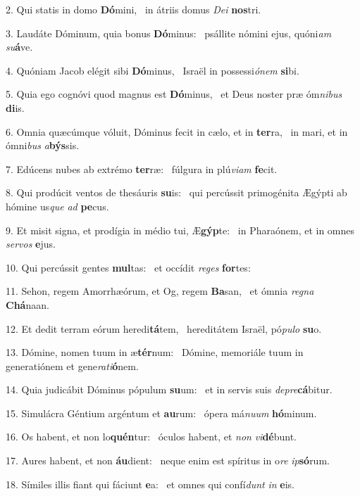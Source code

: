 2. Qui statis in domo \textbf{Dó}mini, \ast\  in átriis domus \textit{De}\textit{i} \textbf{nos}tri.\

3. Laudáte Dóminum, quia bonus \textbf{Dó}minus: \ast\  psállite nómini ejus, quóni\textit{am} \textit{su}\textbf{á}ve.\

4. Quóniam Jacob elégit sibi \textbf{Dó}minus, \ast\  Israël in possessi\textit{ó}\textit{nem} \textbf{si}bi.\

5. Quia ego cognóvi quod magnus est \textbf{Dó}minus, \ast\  et Deus noster præ óm\textit{ni}\textit{bus} \textbf{di}is.\

6. Omnia quæcúmque vóluit, Dóminus fecit in cælo, et in \textbf{ter}ra, \ast\  in mari, et in ómni\textit{bus} \textit{a}\textbf{býs}sis.\

7. Edúcens nubes ab extrémo \textbf{ter}ræ: \ast\  fúlgura in plú\textit{vi}\textit{am} \textbf{fe}cit.\

8. Qui prodúcit ventos de thesáuris \textbf{su}is: \ast\  qui percússit primogénita Ægýpti ab hómine us\textit{que} \textit{ad} \textbf{pe}cus.\

9. Et misit signa, et prodígia in médio tui, Æ\textbf{gýp}te: \ast\  in Pharaónem, et in omnes \textit{ser}\textit{vos} \textbf{e}jus.\

10. Qui percússit gentes \textbf{mul}tas: \ast\  et occídit \textit{re}\textit{ges} \textbf{for}tes:\

11. Sehon, regem Amorrhæórum, et Og, regem \textbf{Ba}san, \ast\  et ómnia \textit{re}\textit{gna} \textbf{Chá}naan.\

12. Et dedit terram eórum heredi\textbf{tá}tem, \ast\  hereditátem Israël, pó\textit{pu}\textit{lo} \textbf{su}o.\

13. Dómine, nomen tuum in æ\textbf{tér}num: \ast\  Dómine, memoriále tuum in generatiónem et gene\textit{ra}\textit{ti}\textbf{ó}nem.\

14. Quia judicábit Dóminus pópulum \textbf{su}um: \ast\  et in servis suis \textit{de}\textit{pre}\textbf{cá}bitur.\

15. Simulácra Géntium argéntum et \textbf{au}rum: \ast\  ópera má\textit{nu}\textit{um} \textbf{hó}minum.\

16. Os habent, et non lo\textbf{quén}tur: \ast\  óculos habent, et \textit{non} \textit{vi}\textbf{dé}bunt.\

17. Aures habent, et non \textbf{áu}dient: \ast\  neque enim est spíritus in o\textit{re} \textit{ip}\textbf{só}rum.\

18. Símiles illis fiant qui fáciunt \textbf{e}a: \ast\  et omnes qui confí\textit{dunt} \textit{in} \textbf{e}is.\

